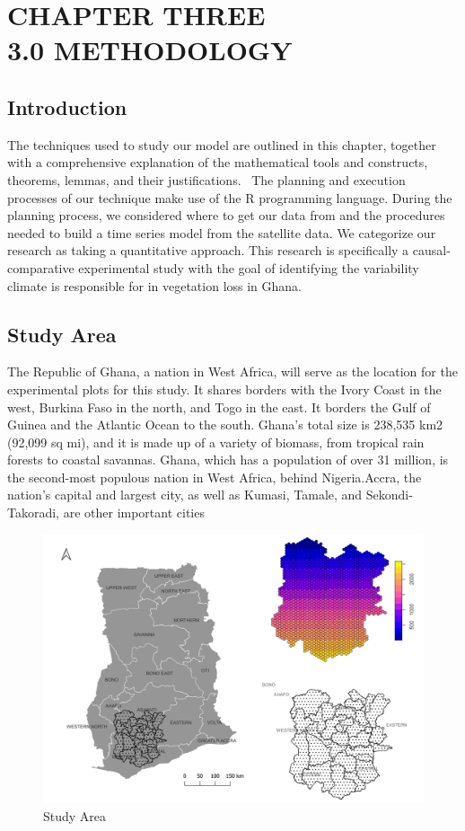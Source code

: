 
\chapter{CHAPTER THREE\\3.0 METHODOLOGY} %

\label{Chapter3} %


\section{Introduction}
The techniques used to study our model are outlined in this chapter, together with a comprehensive explanation of the mathematical tools and constructs, theorems, lemmas, and their justifications.  The planning and execution processes of our technique make use of the R programming language. During the planning process, we considered where to get our data from and the procedures needed to build a time series model from the satellite data. We categorize our research as taking a quantitative approach. This research is specifically a causal-comparative experimental study with the goal of identifying the variability climate is responsible for in vegetation loss in Ghana.
 \section{Study Area}
 The Republic of Ghana, a nation in West Africa, will serve as the location for the experimental plots for this study. It shares borders with the Ivory Coast in the west, Burkina Faso in the north, and Togo in the east. It borders the Gulf of Guinea and the Atlantic Ocean to the south. Ghana's total size is 238,535 km2 (92,099 sq mi), and it is made up of a variety of biomass, from tropical rain forests to coastal savannas. Ghana, which has a population of over 31 million, is the second-most populous nation in West Africa, behind Nigeria.Accra, the nation's capital and largest city, as well as Kumasi, Tamale, and Sekondi-Takoradi, are other important cities
\begin{figure}
	\centering
	\includegraphics[width=0.9\linewidth]{images/StudyArea}
	\caption{Study Area}
	\label{fig:studyarea}
\end{figure}
